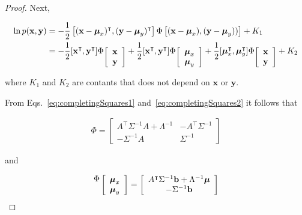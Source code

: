 \begin{proof}
    Next,

    \begin{align}
        \ln p(\mathbf{x},\mathbf{y})&=-\frac{1}{2}\left[(\mathbf{x}-\boldsymbol{\mu}_x)^\intercal,(\mathbf{y}-\boldsymbol{\mu}_y)^\intercal\right]\Phi\left[(\mathbf{x}-\boldsymbol{\mu}_x),(\mathbf{y}-\boldsymbol{\mu}_y))\right]+K_1\nonumber\\
                                    &=-\frac{1}{2}[\mathbf{x}^\intercal,\mathbf{y}^\intercal]\Phi\raisebox{-0.7em}{$\left[\begin{array}{c}\mathbf{x}\\\mathbf{y}\end{array}\right]$}+\frac{1}{2}[\mathbf{x}^\intercal,\mathbf{y}^\intercal]\Phi\raisebox{-0.7em}{$\left[\begin{array}{c}\boldsymbol{\mu}_x\\\boldsymbol{\mu}_y\end{array}\right]$}+\frac{1}{2}[\boldsymbol{\mu}_x^\intercal,\boldsymbol{\mu}_y^\intercal]\Phi\raisebox{-0.7em}{$\left[\begin{array}{c}\mathbf{x}\\\mathbf{y}\end{array}\right]$}+K_2\label{eq:completingSquares2}
    \end{align}

    \noindent where $K_1$ and $K_2$ are contants that does not depend on $\mathbf{x}$ or
    $\mathbf{y}$.


    From Eqs.~\ref{eq:completingSquares1} and~\ref{eq:completingSquares2}
    it follows that

    \begin{align}
        \Phi=\left[\begin{array}{cc}
                       A^\intercal\Sigma^{-1}A+\Lambda^{-1}&-A^\intercal\Sigma^{-1}\nonumber\\
                       -\Sigma^{-1}A&\Sigma^{-1}
                   \end{array}\right]
    \end{align}

    \noindent and

    \begin{align*}
        \raisebox{0.7em}{$\Phi$}\left[\begin{array}{c}\boldsymbol{\mu}_x\\\boldsymbol{\mu}_y\end{array}\right]=
            \left[\begin{array}{c}
                      A^\intercal\Sigma^{-1}\mathbf{b}+\Lambda^{-1}\boldsymbol{\mu}\\
                      -\Sigma^{-1}\mathbf{b}
                  \end{array}\right]
    \end{align*}


\end{proof}
